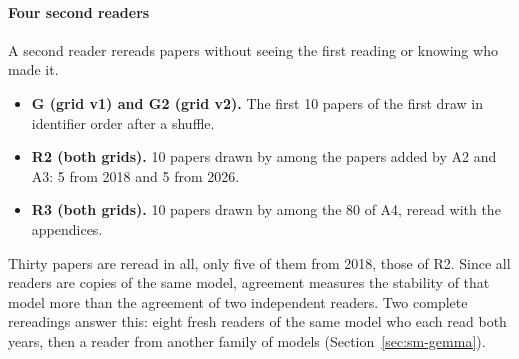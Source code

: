 \paragraph{Four second readers}
A second reader rereads papers without seeing the first reading or knowing who made it.
\begin{itemize}
  \item \textbf{G (grid v1) and G2 (grid v2).} The first 10 papers of the first draw in identifier
  order after a  shuffle.
  \item \textbf{R2 (both grids).} 10 papers drawn by  among the papers added by
  A2 and A3: 5 from 2018 and 5 from 2026.
  \item \textbf{R3 (both grids).} 10 papers drawn by  among the 80 of A4,
  reread with the appendices.
\end{itemize}
Thirty papers are reread in all, only five of them from 2018, those of R2. Since all readers are
copies of the same model, agreement measures the stability of that model more than the agreement of
two independent readers. Two complete rereadings answer this: eight fresh readers of the same model
who each read both years, then a reader from another family of models (Section~\ref{sec:sm-gemma}).

